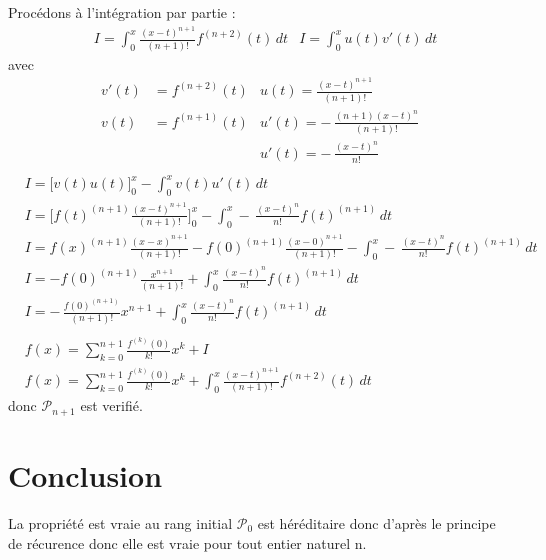 \documentclass{article}
\newcommand*{\p}[1]{$\mathcal{P}_{#1}$}
\begin{document}
Procédons à l'intégration par partie :
\begin{align*}
&I=\int_{0}^{x}
\frac{(x-t)^{n+1}}{(n+1)!}
f^{(n+2)}(t)\,dt
&I=\int_{0}^{x}u(t)v'(t)\,dt
\end{align*}
avec
\begin{align*}
  v'(t)&=f^{(n+2)}(t)&u(t)=\frac{(x-t)^{n+1}}{(n+1)!}\\
  v(t)&=f^{(n+1)}(t)&u'(t)=-\,\frac{(n+1)(x-t)^{n}}{(n+1)!}\\
  & &u'(t)=-\,\frac{(x-t)^{n}}{n!}\\
\end{align*}
\begin{align*}
&I=\big[v(t)u(t)\big]_{0}^{x}-\int_{0}^{x}v(t)u'(t)\,dt\\
&I=\Biggl[f(t)^{(n+1)}\frac{(x-t)^{n+1}}{(n+1)!}\Biggl]^{x}_{0}
-\int_{0}^{x}-\,\frac{(x-t)^{n}}{n!}f(t)^{(n+1)}\,dt\\
&I=f(x)^{(n+1)}\frac{(x-x)^{n+1}}{(n+1)!}
-f(0)^{(n+1)}\frac{(x-0)^{n+1}}{(n+1)!}
-\int_{0}^{x}-\,\frac{(x-t)^{n}}{n!}f(t)^{(n+1)}\,dt\\
&I=-f(0)^{(n+1)}\frac{x^{n+1}}{(n+1)!}
+\int_{0}^{x}\frac{(x-t)^{n}}{n!}f(t)^{(n+1)}\,dt\\
&I=-\,\frac{f(0)^{(n+1)}}{(n+1)!}x^{n+1}
+\int_{0}^{x}\frac{(x-t)^{n}}{n!}f(t)^{(n+1)}\,dt\\\\
&f(x)=\sum_{k=0}^{n+1} \frac{f^{(k)}(0)}{k!}x^k+I\\
&f(x)=\sum_{k=0}^{n+1} \frac{f^{(k)}(0)}{k!}x^k+\int_{0}^{x}
\frac{(x-t)^{n+1}}{(n+1)!}
f^{(n+2)}(t)\,dt
\end{align*}
donc \p{n+1} est verifié.

\section{Conclusion}
La propriété est vraie au rang initial \p{0} est héréditaire
donc d'après le principe de récurence
 donc elle est vraie pour tout entier naturel n.
\end{document}
